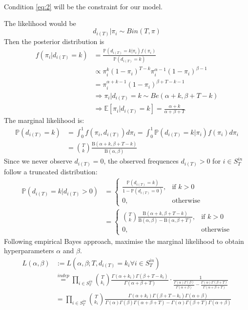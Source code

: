 \documentclass[a4paper, 12pt]{article}
\begin{document}
Condition \eqref{eq:2} will be the constraint for our model.

The likelihood would be
\begin{equation*}
    d_{i(T)} |\pi_i \sim Bin(T, \pi)
\end{equation*}
Then the posterior distribution is
\begin{align*}
    f(\pi_i | d_{i(T)} = k) &= \frac{\mathbb{P}(d_{i(T)} = k | \pi_i) f(\pi_i)}{\mathbb{P}(d_{i(T)} = k)} \\
    &\propto \pi_i^k(1 - \pi_i)^{T - k}\pi_i^{\alpha - 1}(1 - \pi_i)^{\beta - 1}\\
    &= \pi_i^{\alpha + k - 1}(1 - \pi_i)^{\beta + T - k - 1}\\
    &\Rightarrow \pi_i | d_{i(T)} = k \sim Be(\alpha + k, \beta + T - k)\\
    &\Rightarrow \mathbb{E}[\pi_i|d_{i(T)} = k] = \frac{\alpha + k}{\alpha + \beta + T}
\end{align*}
The marginal likelihood is:
\begin{align*}
    \mathbb{P}(d_{i(T)} = k) &= \int_0^1 f(\pi_i, d_{i(T)})d\pi_i = \int_0^1 \mathbb{P}(d_{i(T)} = k | \pi_i)f(\pi_i)d\pi_i\\
    &= \binom{T}{k} \frac{\mathrm{B}(\alpha + k, \beta + T - k)}{\mathrm{B}(\alpha, \beta)}
\end{align*}
Since we never observe $d_{i(T)} = 0$, the observed frequences $d_{i(T)} > 0$ for $i \in S_{T}^{in}$ follow a truncated distribution:
\begin{align*}
\mathbb{P}(d_{i(T)} = k | d_{i(T)} > 0) &= 
\begin{cases}
    \frac{\mathbb{P}(d_{i(T)} = k)}{1 - \mathbb{P}(d_{i(T)} = 0)},& \text{if } k > 0 \\
    0, & \text{otherwise}
\end{cases}\\
&=
\begin{cases}
    \binom{T}{k} \frac{\mathrm{B}(\alpha + k, \beta + T - k)}{\mathrm{B}(\alpha, \beta) - \mathrm{B}(\alpha, \beta + T)},& \text{if } k > 0 \\
    0, & \text{otherwise}
\end{cases}
\end{align*}
Following empirical Bayes approach, maximise the marginal likelihood to obtain hyperparameters $\alpha$ and $\beta$.
\begin{align} \label{eq:3}
    L(\alpha, \beta) &:= L(\alpha, \beta; T, d_{i(T)} = k_i \forall i \in S_T^{in}) \nonumber \\
    &\overset{indep}{=} \prod_{i \in S_T^{in}} \binom{T}{k_i} \frac{\Gamma(\alpha + k_i)\Gamma(\beta + T - k_i)}{\Gamma(\alpha + \beta + T)} \cdot \frac{1}{\frac{\Gamma(\alpha)\Gamma(\beta)}{\Gamma(\alpha + \beta)} - \frac{\Gamma(\alpha)\Gamma(\beta + T)}{\Gamma(\alpha + \beta + T)}} \nonumber \\
    &= \prod_{i \in S_T^{in}} \binom{T}{k_i} \frac{\Gamma(\alpha + k_i)\Gamma(\beta + T - k_i)\Gamma(\alpha + \beta)}{\Gamma(\alpha)\Gamma(\beta)\Gamma(\alpha + \beta + T) - \Gamma(\alpha)\Gamma(\beta + T)\Gamma(\alpha + \beta)} \nonumber \\
\end{align}
\end{document}
